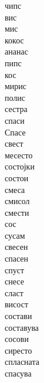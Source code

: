 \documentclass[a5paper,12pt]{article}
\newenvironment{activity}[1]{%
  \begin{tcolorbox}[colback=boxcolor,colframe=titlecolor,title={\textbf{#1}},fonttitle=\bfseries]
}{%
  \end{tcolorbox}
}
\begin{document}
\begin{activity}{Зборчиња}
\begin{multicols}{4}
чипс\\ вис\\ мис\\ кокос\\ ананас\\ пипс\\ кос\\ мирис\\ полис\\ сестра\\ спаси\\ Спасе\\ свест\\ месесто\\ состојки\\ состои\\ смеса\\
смисол\\ смести\\ сос\\ сусам\\ свесен\\ спасен\\ спуст\\ снесе\\ сласт\\ висост\\ состави\\ составува\\ сосови\\ сиресто\\ спласната\\ спасува
\end{multicols}
\end{activity}
\end{document}
